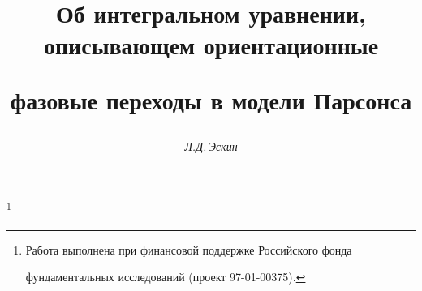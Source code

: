 

 




 


\newcommand{\tts}[1]{} 


 




 


\setcounter{page}{63} 












 


\author{\it Л.Д.\,Эскин} 




\title{Об интегральном уравнении, описывающем ориентационные  


фазовые переходы в модели Парсонса} 


\thanks{Работа выполнена при финансовой поддержке Российского фонда 


фундаментальных исследований (проект 97-01-00375).} 


 


\date{} 




\pagestyle{plain} %


 




\maketitle 



